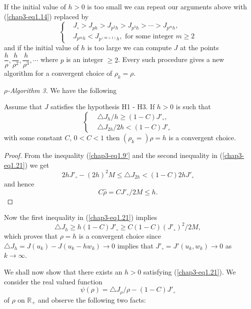 If the initial value of $h > 0$ is too small we can repeat our arguments above with (\ref{chap3-eq1.14}) replaced by
\begin{equation*}
\begin{cases}
& J_{\circ} > J_{ph} > J_{p^{2} h} > J_{p^{3} h} > \cdots > J_{p^{m} h},\\
& J_{p^{m} h} < J_{p^{(m+1)} h}, \text{ for some integer } m \geq 2\tag*{$(1.14)'$}\label{chap3-eq1.14'}
\end{cases}
\end{equation*}
and if the initial value of $h$ is too large we can compute $J$ at the points $\dfrac{h}{\rho}, \dfrac{h}{\rho^{2}}, \dfrac{h}{\rho^{3}}, \cdots$ where $p$ is an integer $\geq 2$. Every such procedure gives a new algorithm for a convergent choice of $\rho_{k} = \rho$.

{\em $\rho$-Algorithm 3.} We have the following
\begin{proposition}\label{chap3-prop1.6}
Assume that $J$ satisfies the hypothesis H1 - H3. If $h > 0$ is such that
\begin{equation*}
\begin{cases}
& \triangle J_{h}/h \geq (1-C) {J'}_{\circ},\\
& \triangle J_{2h} / 2h < (1- C) {J'}_{\circ}\tag{1.21}\label{chap3-eq1.21}
\end{cases}
\end{equation*}
with some constant $C$, $0 < C < 1$ then $(\rho_{k}=)\rho = h$ is a convergent choice.
\end{proposition}

\begin{proof}
From the inequality (\ref{chap3-eq1.9'} and the second inequality in (\ref{chap3-eq1.21}) we get
$$
2h{J'}_{\circ} - (2h)^{2} M \leq \triangle J_{2h} < (1-C) 2h {J'}_{\circ}
$$
and hence
$$
C \hat{\rho} = C{J'}_{\circ} / 2M \leq h.
$$\pageoriginale
\end{proof}

Now the first inequality in (\ref{chap3-eq1.21}) implies
\begin{equation*}
\triangle J_{h} \geq h(1-C) {J'}_{\circ} \geq C(1-C)({J'}_{\circ})^{2}/2M,\tag{1.22}\label{chap3-eq1.22}
\end{equation*}
which proves that $\rho = h$ is a convergent choice since $\triangle J_{h} = J(u_{k}) - J(u_{k} - hw_{k}) \to 0$ implies that ${J'}_{\circ} = {J'}(u_{k}, w_{k}) \to 0$ as $k \to \infty$.

We shall now show that there exists an $h > 0$ satisfying (\ref{chap3-eq1.21}). We consider the real valued function
$$
\psi(\rho) = \triangle J_{\rho} / \rho - (1-C){J'}_{\circ}
$$
of $\rho$ on $\mathbb{R}_{+}$ and observe the following two facts:

